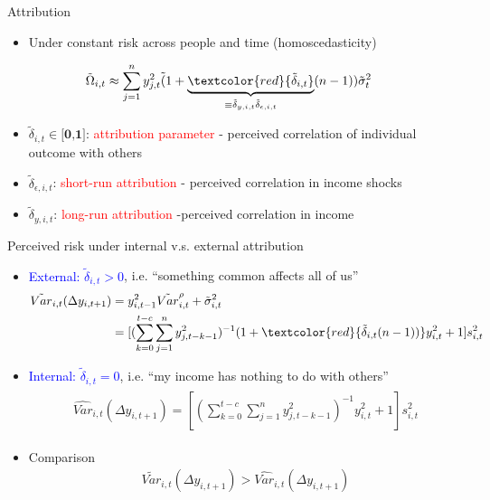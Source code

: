 \documentclass{beamer}
\begin{document}
\begin{frame}{Attribution}
	
	\begin{itemize}
		\item Under constant risk across people and time (homoscedasticity)
	\end{itemize}
	\begin{eqnarray}
		\begin{split}
			\tilde \Omega_{i,t}  & \approx \sum^{n}_{j=1}y^2_{j,t} \tilde (1+\underbrace{\textcolor{red}{\tilde \delta_{i,t}}}_{\equiv \tilde \delta_{y,i,t}\tilde \delta_{\epsilon,i,t}}(n-1)) \tilde \sigma^2_{t} 
		\end{split}
	\end{eqnarray}
	\begin{itemize}
		\item $\tilde \delta_{i,t} \in \textbf{[0,1]}$: \textcolor{red}{attribution parameter} - perceived correlation of individual outcome with others 
		\item $\tilde \delta_{\epsilon, i,t}$: \textcolor{red}{short-run attribution} -  perceived correlation in income shocks 
		\item $\tilde \delta_{y, i,t}$: \textcolor{red}{long-run attribution} -perceived correlation in income 
		
	\end{itemize}
\end{frame}


\begin{frame}{Perceived risk under internal  v.s. external attribution}
	
	\begin{itemize}
		\item \textcolor{blue}{External: $\tilde \delta_{i,t} >0$}, i.e. ``something common affects all of us''
		\begin{eqnarray}
			\begin{split}
				\tilde {Var}_{i,t}(\Delta y_{i,t+1}) & = y_{i,t-1}^2 \tilde{Var}^{\rho}_{i,t} + \tilde{\sigma}^2_{i,t} \\
				& = [(\sum^{t-c}_{k=0}\sum^{n}_{j=1}y^2_{j,t-k-1})^{-1}(1+\textcolor{red}{ \tilde\delta_{i,t}(n-1))}y^2_{i,t} + 1] s^2_{i,t}
			\end{split}
		\end{eqnarray}
		\item \textcolor{blue}{Internal: $\tilde \delta_{i,t} =0$}, i.e. ``my income has nothing to do with others''
		\begin{eqnarray}
			\begin{split}
				\widehat{Var}_{i,t}(\Delta y_{i,t+1}) = [(\sum^{t-c}_{k=0}\sum^{n}_{j=1}y^2_{j,t-k-1})^{-1}y^2_{i,t} + 1] s^2_{i,t} 
			\end{split}
		\end{eqnarray}
		\item Comparison
		\begin{eqnarray}
			\tilde {Var}_{i,t}(\Delta y_{i,t+1}) > \widehat{Var}_{i,t}(\Delta y_{i,t+1})
		\end{eqnarray}
	\end{itemize}
	
\end{frame}
\end{document}
